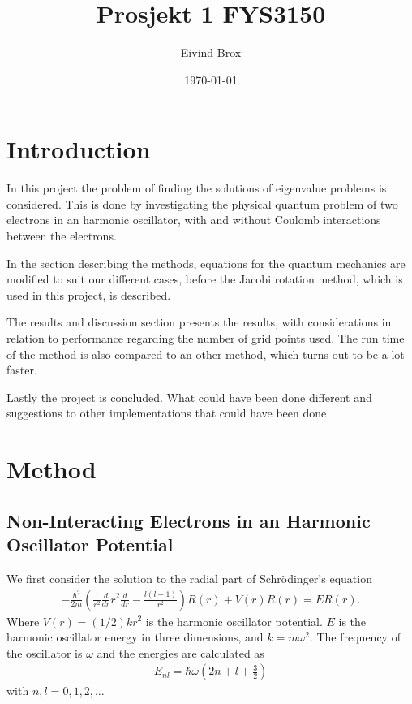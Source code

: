 \documentclass[11pt, a4paper]{article}
\author{Eivind Brox}
\title{Prosjekt 1 FYS3150}
\date{\today}
\begin{document}
\maketitle
\thispagestyle{empty}
\clearpage

\pagestyle{headings}
\tableofcontents
\clearpage

\section{Introduction}
In this project the problem of finding the solutions of eigenvalue problems is considered. This is done by investigating the physical quantum problem of two electrons in an harmonic oscillator, with and without Coulomb interactions between the electrons. 

In the section describing the methods, equations for the quantum mechanics are modified to suit our different cases, before the Jacobi rotation method, which is used in this project, is described. 

The results and discussion section presents the results, with considerations in relation to performance regarding the number of grid points used. The run time of the method is also compared to an other method, which turns out to be a lot faster.

Lastly the project is concluded. What could have been done different and suggestions to other implementations that could have been done 


\clearpage


\section{Method}
\subsection{Non-Interacting Electrons in an Harmonic Oscillator Potential}
We first consider the solution to the radial part of Schr\"odinger's equation
\begin{gather}
  -\frac{\hbar^2}{2 m} \left ( \frac{1}{r^2} \frac{d}{dr} r^2
  \frac{d}{dr} - \frac{l (l + 1)}{r^2} \right )R(r) + V(r) R(r) = E R(r).
\end{gather}
Where $V(r) = (1/2)kr^2$ is the harmonic oscillator potential. $E$ is the harmonic oscillator energy in three dimensions, and $k=m\omega^2$. The frequency of the oscillator is $\omega$ and the energies are calculated as
\begin{gather}
E_{nl}=  \hbar \omega \left(2n+l+\frac{3}{2}\right)
\end{gather}
with $n,l = 0,1,2,\dots$
\end{document}

